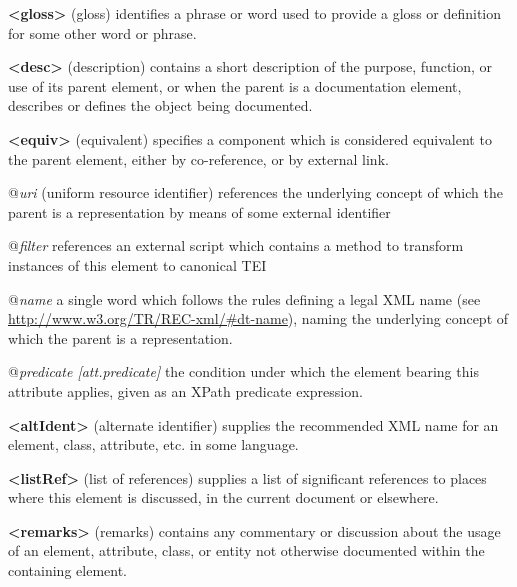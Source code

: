 \begin{sansreflist}
  
\item [\textbf{<gloss>}] (gloss) identifies a phrase or word used to provide a gloss or definition for some other word or phrase.
\item [\textbf{<desc>}] (description) contains a short description of the purpose, function, or use of its parent element, or when the parent is a documentation element, describes or defines the object being documented. 
\item [\textbf{<equiv>}] (equivalent) specifies a component which is considered equivalent to the parent element, either by co-reference, or by external link.\hfil\\[-10pt]\begin{sansreflist}
    \item[@{\itshape uri}]
  (uniform resource identifier) references the underlying concept of which the parent is a representation by means of some external identifier
    \item[@{\itshape filter}]
  references an external script which contains a method to transform instances of this element to canonical TEI
    \item[@{\itshape name}]
  a single word which follows the rules defining a legal XML name (see \url{http://www.w3.org/TR/REC-xml/\#dt-name}), naming the underlying concept of which the parent is a representation.
    \item[@{\itshape predicate [att.predicate]}]
  the condition under which the element bearing this attribute applies, given as an XPath predicate expression.
\end{sansreflist}  
\item [\textbf{<altIdent>}] (alternate identifier) supplies the recommended XML name for an element, class, attribute, etc. in some language.
\item [\textbf{<listRef>}] (list of references) supplies a list of significant references to places where this element is discussed, in the current document or elsewhere.
\item [\textbf{<remarks>}] (remarks) contains any commentary or discussion about the usage of an element, attribute, class, or entity not otherwise documented within the containing element.
\end{sansreflist}
\par

